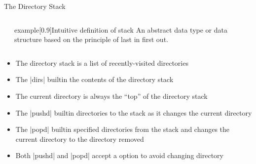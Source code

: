\begin{frame}{The Directory Stack}{}
    \vspace{-3mm}
    \begin{columns}[c]
        \begin{column}{0.1\textwidth}
        \end{column}
        \begin{column}{0.6\textwidth}
            \begin{varblock}{example}[0.9\textwidth]{Intuitive definition of stack}
                An abstract data type or data structure based on the principle of last in first out.
            \end{varblock}
        \end{column}
        \begin{column}{0.3\textwidth}
        \end{column}
    \end{columns}
    \vspace{6mm}
    \begin{itemize}
        \item The directory stack is a list of recently-visited directories
        \item The \bash|dirs| builtin  the contents of the directory stack \\[1mm]
        \item \alert{The current directory is always the ``top'' of the directory stack}
        \item The \bash|pushd| builtin  directories to the  stack as it changes the current directory
        \item The \bash|popd| builtin  specified directories from the stack and changes the current directory to the directory removed
        \item Both \bash|pushd| and \bash|popd| accept a  option to avoid changing directory
    \end{itemize}
\end{frame}
